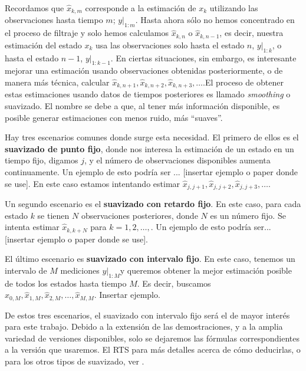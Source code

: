 Recordamos que \(\hat{x}_{k,m}\) corresponde a la estimación de \(x_k\) utilizando las observaciones hasta tiempo \(m\); \(\left. y \right|_{1:m}\). Hasta ahora sólo no hemos concentrado en el proceso de filtraje y solo hemos calculamos \(\hat{x}_{k,n}\) o \(\hat{x}_{k, n-1}\), es decir, nuestra estimación del estado \(x_k\) usa las observaciones solo hasta el estado \(n\), \(\left. y \right|_{1:k}\), o hasta el estado \(n-1\),   \(\left. y \right|_{1:k-1}\). En ciertas situaciones, sin embargo, es interesante mejorar una estimación usando observaciones obtenidas posteriormente, o de manera más técnica, calcular \(\hat{x}_{k, n+1}, \hat{x}_{k, n+2}, \hat{x}_{k, n+3}, \dots\).El proceso de obtener estas estimaciones usando datos de tiempos posteriores es llamado \textit{smoothing} o suavizado. El nombre se debe a que, al tener más información disponible, es posible generar estimaciones con menos ruido, más ``suaves''.

Hay tres escenarios comunes donde surge esta necesidad. El primero de ellos es el \textbf{suavizado de punto fijo}, donde nos interesa la estimación de un estado en un tiempo fijo, digamos \(j\), y el número de observaciones disponibles aumenta continuamente. Un ejemplo de esto podría ser ... [insertar ejemplo o paper donde se use]. En este caso estamos intentando estimar \(\hat{x}_{j, j+1}, \hat{x}_{j, j+2}, \hat{x}_{j, j+3}, \dots\). 

Un segundo escenario es el \textbf{suavizado con retardo fijo}. En este caso, para cada estado \(k\) se tienen \(N\) observaciones posteriores, donde \(N\) es un número fijo. Se intenta estimar \(\hat{x}_{k, k+N}\) para \(k = 1, 2, \dots, \). Un ejemplo de esto podría ser... [insertar ejemplo o paper donde se use]. 

El último escenario es \textbf{suavizado con intervalo fijo}. En este caso, tenemos un intervalo de \(M\) mediciones \(\left. y \right|_{1:M}\)y queremos obtener la mejor estimación posible de todos los estados hasta tiempo \(M\). Es decir, buscamos \(\hat{x}_{0,M}, \hat{x}_{1,M}, \hat{x}_{2,M}, \dots, \hat{x}_{M,M}\). Insertar ejemplo.

De estos tres escenarios, el suavizado con intervalo fijo será el de mayor interés para este trabajo. Debido a la extensión de las demostraciones, y a la amplia variedad de versiones disponibles, solo se dejaremos las fórmulas correspondientes a la versión que usaremos. El RTS  para más detalles acerca de cómo deducirlas, o para los otros tipos de suavizado, ver \cite{Simon2006}.  \\ 

